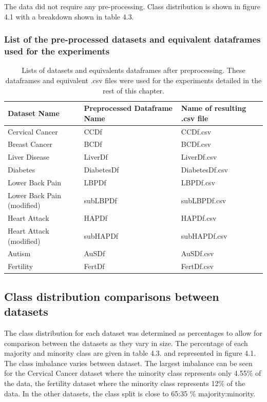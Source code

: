 The data did not require any pre-processing. Class distribution is shown in figure 4.1 with a breakdown shown in table 4.3.


\subsubsection{List of the pre-processed datasets and equivalent dataframes used for the experiments}

\begin{table}[!htbp]
\centering
\begin{tabular}{p{3cm}p{3.5cm}p{3cm}}
  \hline
  \rowcolor{LightCyan}
Dataset Name & Preprocessed Dataframe Name & Name of resulting .csv file\\ 
  \hline
   Cervical Cancer & CCDf & CCDf.csv \\ 
   Breast Cancer & BCDf & BCDf.csv \\ 
   Liver Disease & LiverDf & LiverDf.csv \\ 
   Diabetes & DiabetesDf & DiabetesDf.csv \\ 
   Lower Back Pain & LBPDf &  LBPDf.csv\\ 
   Lower Back Pain (modified) & subLBPDf & subLBPDf.csv \\ 
   Heart Attack & HAPDf & HAPDf.csv \\ 
   Heart Attack (modified) & subHAPDf & subHAPDf.csv \\ 
   Autism & AuSDf & AuSDf.csv \\ 
   Fertility & FertDf & FertDf.csv \\ 
   \hline
\end{tabular}
\caption{Lists of datasets and equivalents dataframes after preprocessing. These dataframes and equivalent .csv files were used for the experiments detailed in the rest of this chapter.}
\end{table}

\subsection{Class distribution comparisons between datasets}
The class distribution for each dataset was determined as percentages to allow for comparison between the datasets as they vary in size. 
The percentage of each majority and minority class are given in table 4.3. and represented in figure 4.1.
The class imbalance varies between dataset. The largest imbalance can be seen for the Cervical Cancer dataset where the minority class represents only 4.55\% of the data, the fertility dataset where the minority class represents 12\% of the data. In the other datasets, the class split is close to 65:35 \% majority:minority.

